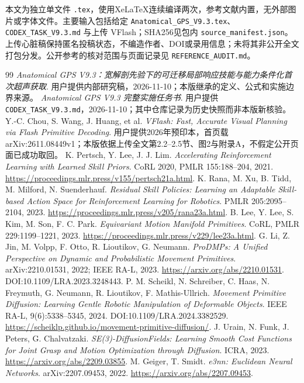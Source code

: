 \documentclass[UTF8,fontset=fandol,11pt,a4paper]{ctexart}
\theoremstyle{plain}
\theoremstyle{definition}
\theoremstyle{remark}
\numberwithin{equation}{section}
\newcommand{\code}[1]{\begingroup\small\nolinkurl{#1}\endgroup}
\begin{document}
本文为独立单文件 \code{.tex}，使用XeLaTeX连续编译两次，参考文献内置，无外部图片或字体文件。主要输入包括给定 \code{Anatomical_GPS_V9.3.tex}、\code{CODEX_TASK_V9.3.md} 与上传 VFlash；SHA256见包内 \code{source_manifest.json}。上传心脏稿保持匿名投稿状态，不编造作者、DOI或录用信息；未将其非公开全文打包分发。公开参考的核对范围与页面记录见 \code{REFERENCE_AUDIT.md}。

\begin{thebibliography}{99}
 \emph{Anatomical GPS V9.3：宽解剖先验下的可迁移局部响应技能与能力条件化首次超声获取}. 用户提供内部研究稿，2026-11-10；本版继承的定义、公式和实施边界来源。
 \emph{Anatomical GPS V9.3 完整实施任务书}. 用户提供 \code{CODEX_TASK_V9.3.md}，2026-11-10；其中仓库记录为历史快照而非本版新核验。
 Y.-C. Chou, S. Wang, J. Huang, et al. \emph{VFlash: Fast, Accurate Visual Planning via Flash Primitive Decoding}. 用户提供2026年预印本，首页载arXiv:2611.08449v1；本版依据上传全文第2.2--2.5节、图2与附录A，不假定公开页面已成功取回。
 K. Pertsch, Y. Lee, J. J. Lim. \emph{Accelerating Reinforcement Learning with Learned Skill Priors}. CoRL 2020, PMLR 155:188--204, 2021. \url{https://proceedings.mlr.press/v155/pertsch21a.html}.
 K. Rana, M. Xu, B. Tidd, M. Milford, N. Suenderhauf. \emph{Residual Skill Policies: Learning an Adaptable Skill-based Action Space for Reinforcement Learning for Robotics}. PMLR 205:2095--2104, 2023. \url{https://proceedings.mlr.press/v205/rana23a.html}.
 B. Lee, Y. Lee, S. Kim, M. Son, F. C. Park. \emph{Equivariant Motion Manifold Primitives}. CoRL, PMLR 229:1199--1221, 2023. \url{https://proceedings.mlr.press/v229/lee23a.html}.
 G. Li, Z. Jin, M. Volpp, F. Otto, R. Lioutikov, G. Neumann. \emph{ProDMPs: A Unified Perspective on Dynamic and Probabilistic Movement Primitives}. arXiv:2210.01531, 2022; IEEE RA-L, 2023. \url{https://arxiv.org/abs/2210.01531}. DOI:10.1109/LRA.2023.3248443.
 P. M. Scheikl, N. Schreiber, C. Haas, N. Freymuth, G. Neumann, R. Lioutikov, F. Mathis-Ullrich. \emph{Movement Primitive Diffusion: Learning Gentle Robotic Manipulation of Deformable Objects}. IEEE RA-L, 9(6):5338--5345, 2024. DOI:10.1109/LRA.2024.3382529. \url{https://scheiklp.github.io/movement-primitive-diffusion/}.
 J. Urain, N. Funk, J. Peters, G. Chalvatzaki. \emph{SE(3)-DiffusionFields: Learning Smooth Cost Functions for Joint Grasp and Motion Optimization through Diffusion}. ICRA, 2023. \url{https://arxiv.org/abs/2209.03855}.
 M. Geiger, T. Smidt. \emph{e3nn: Euclidean Neural Networks}. arXiv:2207.09453, 2022. \url{https://arxiv.org/abs/2207.09453}.

\end{thebibliography}
\end{document}
